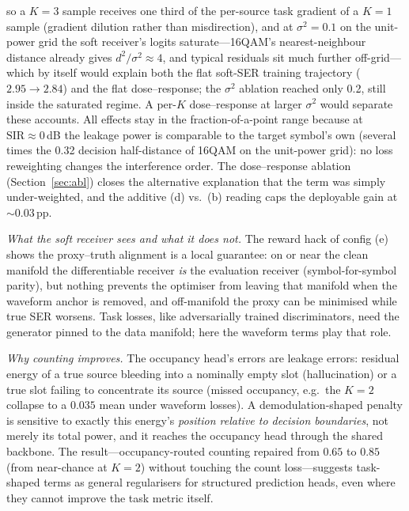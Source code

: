 \documentclass[review,12pt]{elsarticle}
\newcommand{\sir}{\mathrm{SIR}}
\begin{document}
so a $K{=}3$ sample receives one third of the per-source task gradient
of a $K{=}1$ sample (gradient dilution rather than misdirection), and
at $\sigma^2 = 0.1$ on the unit-power grid the soft receiver's logits
saturate---16QAM's nearest-neighbour distance already gives
$d^2/\sigma^2 \approx 4$, and typical residuals sit much further
off-grid---which by itself would explain both the flat soft-SER
training trajectory ($2.95 \to 2.84$) and the flat dose--response; the
$\sigma^2$ ablation reached only 0.2, still inside the saturated
regime. A per-$K$ dose--response at larger $\sigma^2$ would separate
these accounts. All effects stay in the
fraction-of-a-point range because at $\sir \approx 0$\,dB the leakage
power is comparable to the target symbol's own (several times the 0.32
decision half-distance of 16QAM on the unit-power grid): no loss
reweighting changes the interference order. The dose--response ablation
(Section~\ref{sec:abl}) closes the alternative explanation that the term
was simply under-weighted, and the additive (d) vs.\ (b) reading caps
the deployable gain at $\sim$0.03\,pp.

\emph{What the soft receiver sees and what it does not.} The reward hack
of config (e) shows the proxy--truth alignment is a local guarantee: on
or near the clean manifold the differentiable receiver \emph{is} the
evaluation receiver (symbol-for-symbol parity), but nothing prevents the
optimiser from leaving that manifold when the waveform anchor is
removed, and off-manifold the proxy can be minimised while true SER
worsens. Task losses, like adversarially trained discriminators, need
the generator pinned to the data manifold; here the waveform terms play
that role.

\emph{Why counting improves.} The occupancy head's errors are leakage
errors: residual energy of a true source bleeding into a nominally empty
slot (hallucination) or a true slot failing to concentrate its source
(missed occupancy, e.g.\ the $K{=}2$ collapse to a $0.035$ mean under
waveform losses). A demodulation-shaped penalty is sensitive to exactly this
energy's \emph{position relative to decision boundaries}, not merely its
total power, and it reaches the occupancy head through the shared
backbone. The result---occupancy-routed counting repaired from $0.65$ to
$0.85$ (from near-chance at $K{=}2$) without touching the count
loss---suggests task-shaped terms as
general regularisers for structured prediction heads, even where they
cannot improve the task metric itself.
\end{document}
